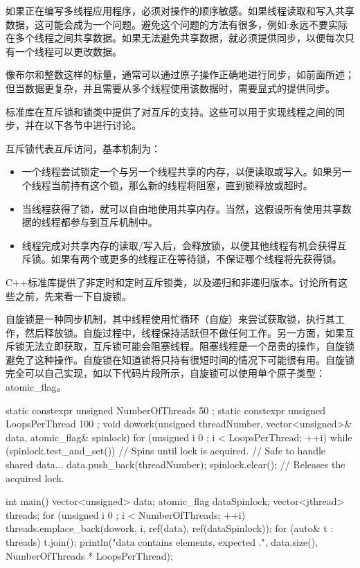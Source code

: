 
如果正在编写多线程应用程序，必须对操作的顺序敏感。如果线程读取和写入共享数据，这可能会成为一个问题。避免这个问题的方法有很多，例如:永远不要实际在多个线程之间共享数据。如果无法避免共享数据，就必须提供同步，以便每次只有一个线程可以更改数据。

像布尔和整数这样的标量，通常可以通过原子操作正确地进行同步，如前面所述；但当数据更复杂，并且需要从多个线程使用该数据时，需要显式的提供同步。

标准库在互斥锁和锁类中提供了对互斥的支持。这些可以用于实现线程之间的同步，并在以下各节中进行讨论。


互斥锁代表互斥访问，基本机制为：

\begin{itemize}
\item
一个线程尝试锁定一个与另一个线程共享的内存，以便读取或写入。如果另一个线程当前持有这个锁，那么新的线程将阻塞，直到锁释放或超时。

\item
当线程获得了锁，就可以自由地使用共享内存。当然，这假设所有使用共享数据的线程都参与到互斥机制中。

\item
线程完成对共享内存的读取/写入后，会释放锁，以便其他线程有机会获得互斥锁。如果有两个或更多的线程正在等待锁，不保证哪个线程将先获得锁。
\end{itemize}

C++标准库提供了非定时和定时互斥锁类，以及递归和非递归版本。讨论所有这些之前，先来看一下自旋锁。


自旋锁是一种同步机制，其中线程使用忙循环（自旋）来尝试获取锁，执行其工作，然后释放锁。自旋过程中，线程保持活跃但不做任何工作。另一方面，如果互斥锁无法立即获取，互斥锁可能会阻塞线程。阻塞线程是一个昂贵的操作，自旋锁避免了这种操作。自旋锁在知道锁将只持有很短时间的情况下可能很有用。自旋锁完全可以自己实现，如以下代码片段所示，自旋锁可以使用单个原子类型：atomic\_flag。

\begin{cpp}
static constexpr unsigned NumberOfThreads { 50 };
static constexpr unsigned LoopsPerThread { 100 };
void dowork(unsigned threadNumber, vector<unsigned>& data, atomic_flag& spinlock)
{
    for (unsigned i { 0 }; i < LoopsPerThread; ++i) {
        while (spinlock.test_and_set()) { } // Spins until lock is acquired.
        // Safe to handle shared data...
        data.push_back(threadNumber);
        spinlock.clear(); // Releases the acquired lock.
    }
}

int main()
{
    vector<unsigned> data;
    atomic_flag dataSpinlock;
    vector<jthread> threads;
    for (unsigned i { 0 }; i < NumberOfThreads; ++i) {
        threads.emplace_back(dowork, i, ref(data), ref(dataSpinlock));
    }
    for (auto& t : threads) { t.join(); }
    println("data contains {} elements, expected {}.", data.size(),
        NumberOfThreads * LoopsPerThread);
}
\end{cpp}

